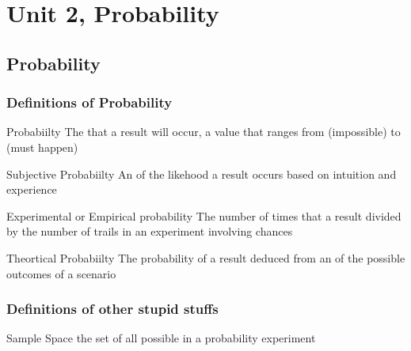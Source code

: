 \chapter{Unit 2, Probability}
\section{Probability}
\subsection{Definitions of Probability}
\begin{cyanblock} 
    \begin{worddef}{Probabiilty}
        The  that a result will occur, a value that ranges from  (impossible) to  (must happen)
    \end{worddef}
\end{cyanblock}

\begin{cyanblock} 
    \begin{worddef}{Subjective Probabiilty}
       An  of the likehood a result occurs based on intuition and experience
    \end{worddef}
\end{cyanblock}

\begin{cyanblock} 
    \begin{worddef}{Experimental or Empirical probability}
        The number of times that a result  divided by the number of trails in an experiment involving chances
    \end{worddef}
\end{cyanblock}

\begin{cyanblock} 
    \begin{worddef}{Theortical Probabiilty}
        The probability of a result deduced from an  of the possible outcomes of a scenario
    \end{worddef}
\end{cyanblock}

\subsection{Definitions of other stupid stuffs}
\begin{cyanblock} 
    \begin{worddef}{Sample Space}
        the set of all possible  in a probability experiment 
    \end{worddef}
\end{cyanblock}

